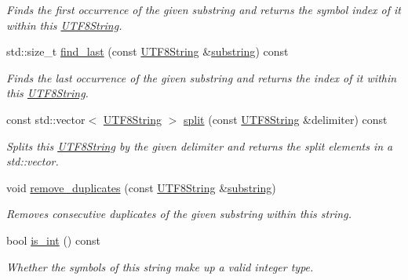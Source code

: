 \begin{DoxyCompactItemize}
\begin{DoxyCompactList}\small\item\em Finds the first occurrence of the given substring and returns the symbol index of it within this \hyperlink{classchaos_1_1uni_1_1_u_t_f8_string}{U\-T\-F8\-String}. \end{DoxyCompactList}\item 
std\-::size\-\_\-t \hyperlink{classchaos_1_1uni_1_1_u_t_f8_string_a482f2501d37379eab6661c45f13b0126}{find\-\_\-last} (const \hyperlink{classchaos_1_1uni_1_1_u_t_f8_string}{U\-T\-F8\-String} \&\hyperlink{classchaos_1_1uni_1_1_u_t_f8_string_a6a92e0b096b7d0087e3c784fa7f891aa}{substring}) const 
\begin{DoxyCompactList}\small\item\em Finds the last occurrence of the given substring and returns the index of it within this \hyperlink{classchaos_1_1uni_1_1_u_t_f8_string}{U\-T\-F8\-String}. \end{DoxyCompactList}\item 
const std\-::vector$<$ \hyperlink{classchaos_1_1uni_1_1_u_t_f8_string}{U\-T\-F8\-String} $>$ \hyperlink{classchaos_1_1uni_1_1_u_t_f8_string_a7d9a171234e75c018c2a0824f77222e7}{split} (const \hyperlink{classchaos_1_1uni_1_1_u_t_f8_string}{U\-T\-F8\-String} \&delimiter) const 
\begin{DoxyCompactList}\small\item\em Splits this \hyperlink{classchaos_1_1uni_1_1_u_t_f8_string}{U\-T\-F8\-String} by the given delimiter and returns the split elements in a std\-::vector. \end{DoxyCompactList}\item 
void \hyperlink{classchaos_1_1uni_1_1_u_t_f8_string_a940e7ccc70fe1d6c486a5a89941dd2ef}{remove\-\_\-duplicates} (const \hyperlink{classchaos_1_1uni_1_1_u_t_f8_string}{U\-T\-F8\-String} \&\hyperlink{classchaos_1_1uni_1_1_u_t_f8_string_a6a92e0b096b7d0087e3c784fa7f891aa}{substring})
\begin{DoxyCompactList}\small\item\em Removes consecutive duplicates of the given substring within this string. \end{DoxyCompactList}\item 
bool \hyperlink{classchaos_1_1uni_1_1_u_t_f8_string_a758102d22056ad004660c49104526642}{is\-\_\-int} () const 
\begin{DoxyCompactList}\small\item\em Whether the symbols of this string make up a valid integer type. \end{DoxyCompactList}\item 

\end{DoxyCompactItemize}
